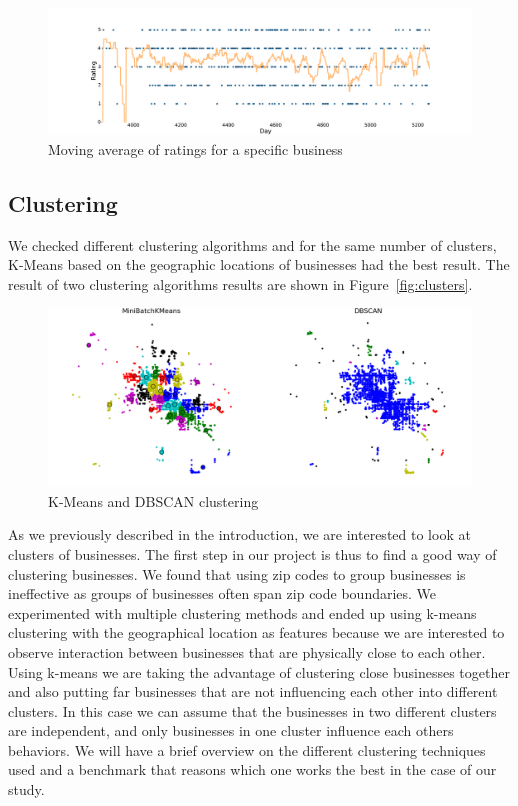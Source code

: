 \documentclass{vldb}
\begin{document}
\begin{figure}[h]
\centering
\includegraphics[width=\columnwidth]{moving_avg.pdf}
\caption{ Moving average of ratings for a specific business}
\label{fig:correlation}
\end{figure}

\subsection{Clustering}
We checked different clustering algorithms and for the same number of clusters, K-Means based on the geographic locations of businesses had the best result. The result of two clustering algorithms results are shown in Figure~\ref{fig:clusters}.

\begin{figure}[h]
\centering
\includegraphics[width=\columnwidth]{clusters.png}
\caption{ K-Means and DBSCAN clustering}
\label{fig:correlation}
\end{figure}

As we previously described in the introduction, we are interested to look at clusters of businesses.
The first step in our project is thus to find a good way of clustering businesses.
We found that using zip codes to group businesses is ineffective as groups of businesses often span zip code boundaries.
We experimented with multiple clustering methods and ended up using k-means clustering with the geographical location as features because we are interested to observe interaction between businesses that are physically close to each other. Using k-means we are taking the advantage of clustering close businesses together and also putting far businesses that are not influencing each other into different clusters. In this case we can assume that the businesses in two different clusters are independent, and only businesses in one cluster influence each others behaviors. We will have a brief overview on the different clustering techniques used and a benchmark that reasons which one works the best in the case of our study.
\end{document}
